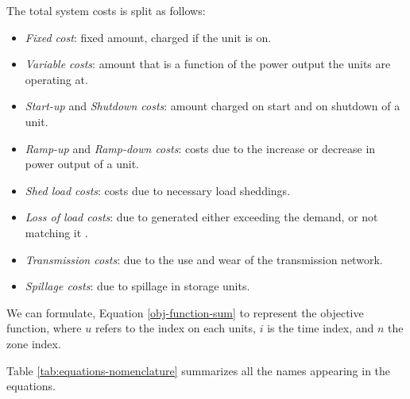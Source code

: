 The total system costs is split as follows:
\begin{itemize}
    \item \textit{Fixed cost}: fixed amount, charged if the unit is on.
    \item \textit{Variable costs}: amount that is a function of the power output the units are operating at.
    \item \textit{Start-up} and \textit{Shutdown costs}: amount charged on start and on shutdown of a unit.
    \item \textit{Ramp-up} and \textit{Ramp-down costs}: costs due to the increase or decrease in power output of a unit.
    \item \textit{Shed load costs}: costs due to necessary load sheddings.
    \item \textit{Loss of load costs}: due to generated either exceeding the demand, or not matching it .
    \item \textit{Transmission costs}: due to the use and wear of the transmission network.
    \item \textit{Spillage costs}: due to spillage in storage units.
\end{itemize}

We can formulate, Equation \ref{obj-function-sum} to represent the objective function, where $u$ refers to the index on each units, $i$ is the time index, and $n$ the zone index.

Table \ref{tab:equations-nomenclature} summarizes all the names appearing in the equations.


